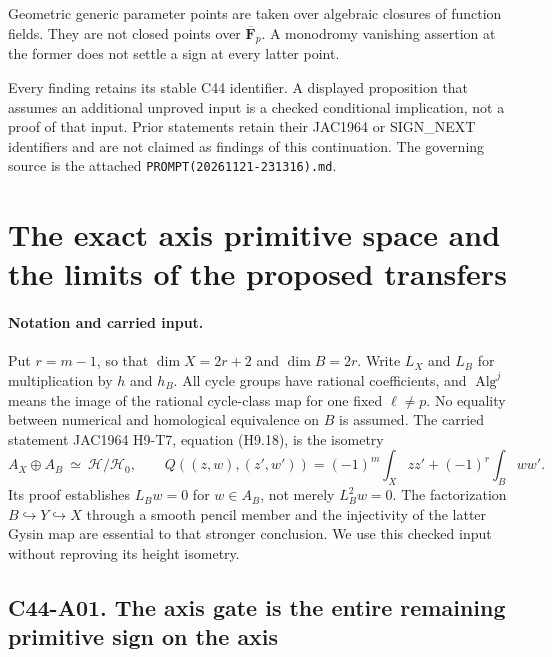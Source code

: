 \documentclass[11pt]{article}
\theoremstyle{remark}\newtheorem{remark}[theorem]{Remark}
\begin{document}
Geometric generic parameter points are taken over algebraic closures
of function fields. They are not closed points over
$\overline{\mathbf F}_p$. A monodromy vanishing assertion at the
former does not settle a sign at every latter point.

Every finding retains its stable C44 identifier. A displayed
proposition that assumes an additional unproved input is a checked
conditional implication, not a proof of that input. Prior statements
retain their JAC1964 or SIGN\_NEXT identifiers and are not claimed
as findings of this continuation. The governing source is the attached
\texttt{PROMPT(20261121-231316).md}.

\section{The exact axis primitive space and the limits of the proposed transfers}

\paragraph{Notation and carried input.}
Put $r=m-1$, so that $\dim X=2r+2$ and $\dim B=2r$.
Write $L_X$ and $L_B$ for multiplication by $h$ and $h_B$.
All cycle groups have rational coefficients, and $\operatorname{Alg}^j$
means the image of the rational cycle-class map for one fixed
$\ell\ne p$. No equality between numerical and homological equivalence
on $B$ is assumed. The carried statement JAC1964 H9-T7, equation
(H9.18), is the isometry
\[
 A_X\oplus A_B\ \simeq\ \mathcal H/\mathcal H_0,
 \qquad
 Q((z,w),(z',w'))=(-1)^m\int_Xzz'+(-1)^r\int_Bww'.
\]
Its proof establishes $L_Bw=0$ for $w\in A_B$, not merely
$L_B^2w=0$. The factorization $B\hookrightarrow Y\hookrightarrow X$
through a smooth pencil member and the injectivity of the latter
Gysin map are essential to that stronger conclusion. We use this
checked input without reproving its height isometry.

\subsection*{C44-A01. The axis gate is the entire remaining primitive sign on the axis}
\end{document}
